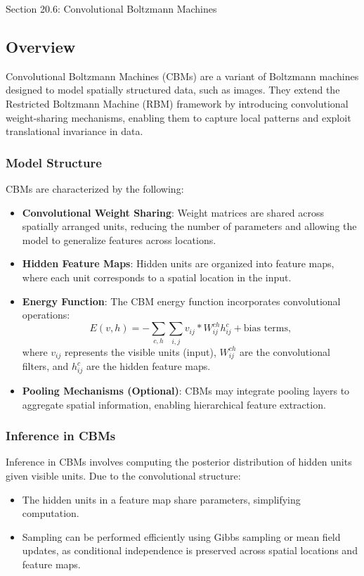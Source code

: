 \begin{notes}{Section 20.6: Convolutional Boltzmann Machines}
    \subsection*{Overview}

    Convolutional Boltzmann Machines (CBMs) are a variant of Boltzmann machines designed to model spatially structured data, such as images. They extend the Restricted Boltzmann Machine (RBM) framework 
    by introducing convolutional weight-sharing mechanisms, enabling them to capture local patterns and exploit translational invariance in data. 
    
    \subsubsection*{Model Structure}
    
    CBMs are characterized by the following:
    \begin{itemize}
        \item \textbf{Convolutional Weight Sharing}: Weight matrices are shared across spatially arranged units, reducing the number of parameters and allowing the model to generalize features across locations.
        \item \textbf{Hidden Feature Maps}: Hidden units are organized into feature maps, where each unit corresponds to a spatial location in the input.
        \item \textbf{Energy Function}: The CBM energy function incorporates convolutional operations:
        \[
        E(v, h) = - \sum_{c,h} \sum_{i,j} v_{ij} * W_{ij}^{ch} h_{ij}^c + \text{bias terms},
        \]
        where $v_{ij}$ represents the visible units (input), $W_{ij}^{ch}$ are the convolutional filters, and $h_{ij}^c$ are the hidden feature maps.
        \item \textbf{Pooling Mechanisms (Optional)}: CBMs may integrate pooling layers to aggregate spatial information, enabling hierarchical feature extraction.
    \end{itemize}
    
    \subsubsection*{Inference in CBMs}
    
    Inference in CBMs involves computing the posterior distribution of hidden units given visible units. Due to the convolutional structure:
    \begin{itemize}
        \item The hidden units in a feature map share parameters, simplifying computation.
        \item Sampling can be performed efficiently using Gibbs sampling or mean field updates, as conditional independence is preserved across spatial locations and feature maps.
    \end{itemize}
    

\end{notes}
